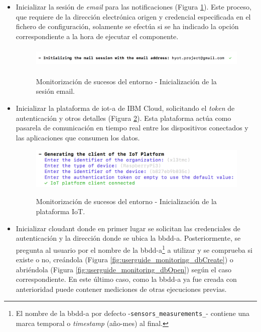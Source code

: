 \documentclass[12pt,a4paper, twoside]{report}
\begin{document}
\begin{itemize}
\begin{itemize}
	 		\end{itemize} 
	 	
	 	\item Inicializar la sesión de \textit{email} para las notificaciones (Figura \ref{fig:userguide_monitoring_mail}). Este proceso, que requiere de la dirección electrónica origen y credencial especificada en el fichero de configuración, solamente se efectúa si se ha indicado la opción correspondiente a la hora de ejecutar el componente.
	 	
	 		\begin{figure}[!ht]   
				\caption{Monitorización de sucesos del entorno - Inicialización de la sesión email.} 
				\begin{center} 
					\includegraphics[width=14cm,height=1cm]{Images/userGuide/monitoring/mail} \\
					\label{fig:userguide_monitoring_mail} 
				\end{center}  
			\end{figure}
	 
	 	\item Inicializar la plataforma de \gls{iot-a} de IBM Cloud, solicitando el \textit{\gls{token}} de autenticación y otros detalles (Figura \ref{fig:userguide_monitoring_iot}). Esta plataforma actúa como pasarela de comunicación en tiempo real entre los dispositivos conectados y las aplicaciones que consumen los datos.
	 
	 	 	\begin{figure}[!ht]   
				\caption{Monitorización de sucesos del entorno - Inicialización de la plataforma IoT.} 
				\begin{center} 
					\includegraphics[width=12cm,height=2cm]{Images/userGuide/monitoring/iotPlatform} \\
					\label{fig:userguide_monitoring_iot} 
				\end{center}  
			\end{figure}
	 
	 	\item Inicializar \gls{cloudant} donde en primer lugar se solicitan las credenciales de autenticación y la dirección donde se ubica la \gls{bbdd-a}. Posteriormente, se pregunta al usuario por el nombre de la \gls{bbdd-a}\footnote{El nombre de la \gls{bbdd-a} por defecto -\texttt{sensors\_measurements\_}- contiene una marca temporal o \textit{timestamp} (año-mes) al final.} a utilizar y se comprueba si existe o no, creándola (Figura \ref{fig:userguide_monitoring_dbCreate}) o abriéndola (Figura \ref{fig:userguide_monitoring_dbOpen}) según el caso correspondiente. En este último caso, como la \gls{bbdd-a} ya fue creada con anterioridad puede contener mediciones de otras ejecuciones previas.
	 	

\end{itemize}
\end{document}
